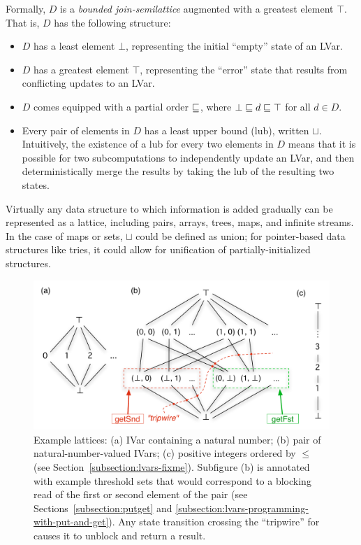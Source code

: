 Formally, $D$ is a \emph{bounded join-semilattice} augmented with a
greatest element $\top$.  That is, $D$ has the following structure:
\begin{itemize}
\item $D$ has a least element $\bot$, representing the initial
  ``empty'' state of an LVar.
\item $D$ has a greatest element $\top$, representing the ``error''
  state that results from conflicting updates to an LVar.
\item $D$ comes equipped with a partial order $\sqsubseteq$, where $\bot
  \sqsubseteq d \sqsubseteq \top$ for all $d \in D$.
\item Every pair of elements in $D$ has a least upper bound (lub),
  written $\sqcup$.  Intuitively, the existence of a lub for every two
  elements in $D$ means that it is possible for two subcomputations to
  independently update an LVar, and then deterministically merge the
  results by taking the lub of the resulting two states.
\end{itemize}

Virtually any data structure to which information is added gradually
can be represented as a lattice, including pairs, arrays, trees, maps,
and infinite streams.  In the case of maps or sets, $\sqcup$ could be
defined as union; for pointer-based data structures like tries, it
could allow for unification of partially-initialized structures.

\begin{figure}
\includegraphics[width=5in]{chapter2/figures/ExampleLattices2.pdf} 
  \caption{Example lattices: (a) IVar containing a natural number; (b)
    pair of natural-number-valued IVars; (c) positive integers ordered
    by $\leq$ (see Section~\ref{subsection:lvars-fixme}).  Subfigure
    (b) is annotated with example threshold sets that would correspond
    to a blocking read of the first or second element of the pair (see
    Sections~\ref{subsection:putget} and
    \ref{subsection:lvars-programming-with-put-and-get}).  Any state
    transition crossing the ``tripwire'' for  causes
    it to unblock and return a result.}
    \label{f:lvars-example-lattices}
\end{figure}

